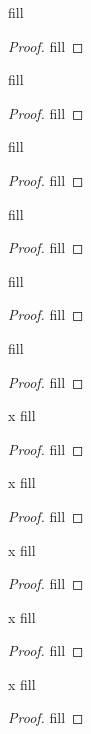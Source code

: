 \begin{exercise}{39}
fill
\end{exercise}
\begin{proof}
fill
\end{proof} 

\begin{exercise}{41}
fill
\end{exercise}
\begin{proof}
fill
\end{proof} 

\begin{exercise}{42}
fill
\end{exercise}
\begin{proof}
fill
\end{proof} 

\begin{exercise}{43}
fill
\end{exercise}
\begin{proof}
fill
\end{proof} 

\begin{exercise}{44}
fill
\end{exercise}
\begin{proof}
fill
\end{proof} 

\begin{exercise}{46}
fill
\end{exercise}
\begin{proof}
fill
\end{proof} 

\begin{exercise}{x}
fill
\end{exercise}
\begin{proof}
fill
\end{proof} 

\begin{exercise}{x}
fill
\end{exercise}
\begin{proof}
fill
\end{proof} 

\begin{exercise}{x}
fill
\end{exercise}
\begin{proof}
fill
\end{proof} 

\begin{exercise}{x}
fill
\end{exercise}
\begin{proof}
fill
\end{proof} 

\begin{exercise}{x}
fill
\end{exercise}
\begin{proof}
fill
\end{proof} 